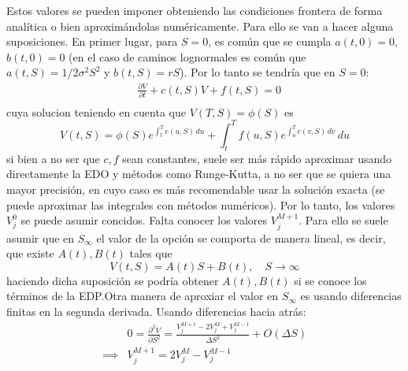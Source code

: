 \newpage




Estos valores se pueden imponer obteniendo las condiciones frontera de forma analítica o bien aproximándolas numéricamente. Para ello se van a hacer alguna suposiciones. En primer lugar, para $S=0$, es común que se cumpla $a(t, 0)=0$, $b(t, 0)=0$ (en el caso de caminos lognormales es común que $a(t, S)=1/2\sigma^2S^2$ y $b(t,S)=rS$). Por lo tanto se tendría que en $S=0$:
\begin{align*}
    &\frac{\partial V}{\partial t} + c(t, S) V + f(t, S) = 0 \\
\end{align*}
cuya solucion teniendo en cuenta que $V(T,S)=\phi(S)$ es
\begin{equation*}
    V(t, S) = \phi(S) e^{\int_t^T c(u, S)\,du} + \int_t^T f(u, S) e^{\int_u^T c(v, S)\,dv}\,du
\end{equation*}
si bien a no ser que $c, f$ sean constantes, suele ser más rápido aproximar usando directamente la EDO y métodos como Runge-Kutta, a no ser que se quiera una mayor precisión, en cuyo caso es más recomendable usar la solución exacta (se puede aproximar las integrales con métodos numéricos). Por lo tanto, los valores $V_j^0$ se puede asumir concidos. Falta conocer los valores $V_j^{M+1}$. Para ello se suele asumir que en $S_\infty$ el valor de la opción se comporta de manera lineal, es decir, que existe $A(t), B(t)$ tales que
\begin{equation*}
    V(t, S) = A(t) S + B(t), \quad S \to \infty
\end{equation*}
haciendo dicha suposición se podría obtener $A(t), B(t)$ si se conoce los términos de la EDP.\@ Otra manera de aproxiar el valor en $S_\infty$ es usando diferencias finitas en la segunda derivada. Usando diferencias hacia atrás:
\begin{align*}
    &0 = \frac{\partial^2 V}{\partial S^2} = \frac{V_j^{M+1} - 2V_j^{M} + V_j^{M-1}}{\Delta S^2} + O(\Delta S) \\
    \implies &V_j^{M+1} = 2V_j^{M} - V_j^{M-1}
\end{align*}

